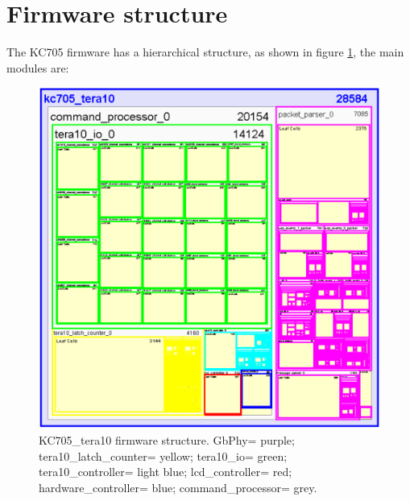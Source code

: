 \section{Firmware structure}\label{structure}
\noindent The KC705 firmware has a hierarchical structure, as shown in figure \ref{fig:tera10}, the main modules are:
\begin{figure}[H]
	\centering
	\includegraphics[width=0.4\linewidth]{IMG/ch4/HIERARCHY5}
	\caption{KC705\_tera10 firmware structure. GbPhy= purple; tera10\_latch\_counter= yellow; tera10\_io= green; tera10\_controller= light blue; lcd\_controller= red; hardware\_controller= blue; command\_processor= grey.}
	\label{fig:tera10}
\end{figure}
